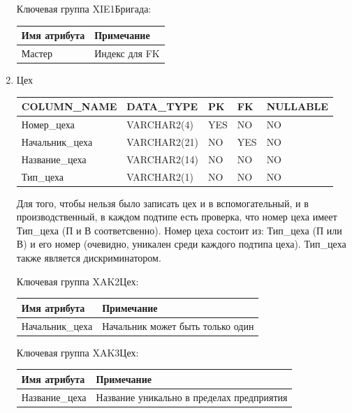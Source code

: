 \begin{enumerate}
    Ключевая группа XIE1Бригада:

    \begin{tabular}{|p{7cm}|p{9.3cm}|} \hline

        {\bf Имя атрибута} & {\bf Примечание} \\ \hline
        Мастер & Индекс для FK \\ \hline

    \end{tabular}

    \item{Цех}

    \begin{tabular}{|p{7cm}|p{3cm}|p{1cm}|p{1cm}|p{3cm}|} \hline

        {\bf COLUMN\_NAME} & {\bf DATA\_TYPE} & {\bf PK} & {\bf FK} & {\bf NULLABLE} \\ \hline
        Номер\_цеха & VARCHAR2(4) & YES & NO & NO \\ \hline
        Начальник\_цеха & VARCHAR2(21) & NO & YES & NO \\ \hline
        Название\_цеха & VARCHAR2(14) & NO & NO & NO \\ \hline
        Тип\_цеха & VARCHAR2(1) & NO & NO & NO \\ \hline

    \end{tabular}

    Для того, чтобы нельзя было записать цех и в вспомогательный, и в производственный, в каждом подтипе есть проверка, что номер цеха имеет Тип\_цеха (П и В соответсвенно).
    Номер цеха состоит из: Тип\_цеха (П или В) и его номер (очевидно, уникален среди каждого подтипа цеха).
    Тип\_цеха также является дискриминатором.

    Ключевая группа XAK2Цех:

    \begin{tabular}{|p{7cm}|p{9.3cm}|} \hline

        {\bf Имя атрибута} & {\bf Примечание} \\ \hline
        Начальник\_цеха & Начальник может быть только один \\ \hline

    \end{tabular}

    Ключевая группа XAK3Цех:

    \begin{tabular}{|p{7cm}|p{9.3cm}|} \hline

        {\bf Имя атрибута} & {\bf Примечание} \\ \hline
        Название\_цеха & Название уникально в пределах предприятия \\ \hline


\end{tabular}
\end{enumerate}
